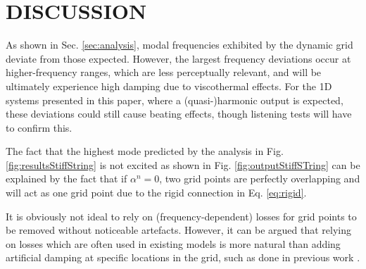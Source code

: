 \documentclass[fleqn]{jaes}
\def\SWcomment[#1]{\textcolor{blue}{#1}}
\begin{document}
\section{DISCUSSION}\label{sec:discussion}
As shown in Sec. \ref{sec:analysis}, modal frequencies exhibited by the dynamic grid deviate from those expected. However, the largest frequency deviations occur at higher-frequency ranges, which are less perceptually relevant, and will be ultimately experience high damping due to viscothermal effects. For the 1D systems presented in this paper, where a (quasi-)harmonic output is expected, these deviations could still cause beating effects, though listening tests will have to confirm this.

The fact that the highest mode predicted by the analysis in Fig. \ref{fig:resultsStiffString} is not excited as shown in Fig. \ref{fig:outputStiffSTring} can be explained by the fact that if $\alpha^n = 0$, two grid points are perfectly overlapping and will act as one grid point due to the rigid connection in Eq. \eqref{eq:rigid}. 

It is obviously not ideal to rely on (frequency-dependent) losses for grid points to be removed without noticeable artefacts. However, it can be argued that relying on losses which are often used in existing models is more natural than adding artificial damping at specific locations in the grid, such as done in previous work \cite{Willemsen2021a, Willemsen2021b}. %
\end{document}
